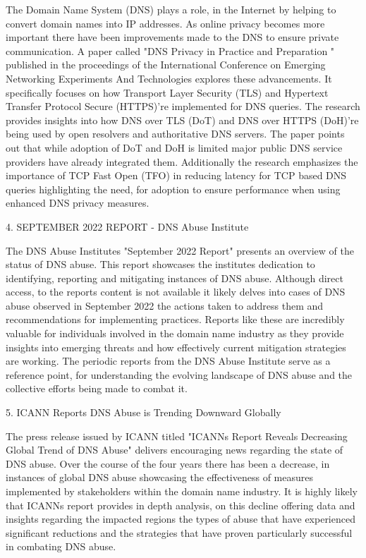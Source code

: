 The Domain Name System (DNS) plays a role, in the Internet by helping to convert domain names into IP addresses. As online privacy becomes more important there have been improvements made to the DNS to ensure private communication. A paper called "DNS Privacy in Practice and Preparation " published in the proceedings of the International Conference on Emerging Networking Experiments And Technologies explores these advancements. It specifically focuses on how Transport Layer Security (TLS) and Hypertext Transfer Protocol Secure (HTTPS)'re implemented for DNS queries. The research provides insights into how DNS over TLS (DoT) and DNS over HTTPS (DoH)'re being used by open resolvers and authoritative DNS servers. The paper points out that while adoption of DoT and DoH is limited major public DNS service providers have already integrated them. Additionally the research emphasizes the importance of TCP Fast Open (TFO) in reducing latency for TCP based DNS queries highlighting the need, for adoption to ensure performance when using enhanced DNS privacy measures.


4. SEPTEMBER 2022 REPORT - DNS Abuse Institute

The DNS Abuse Institutes "September 2022 Report" presents an overview of the status of DNS abuse. This report showcases the institutes dedication to identifying, reporting and mitigating instances of DNS abuse. Although direct access, to the reports content is not available it likely delves into cases of DNS abuse observed in September 2022 the actions taken to address them and recommendations for implementing practices. Reports like these are incredibly valuable for individuals involved in the domain name industry as they provide insights into emerging threats and how effectively current mitigation strategies are working. The periodic reports from the DNS Abuse Institute serve as a reference point, for understanding the evolving landscape of DNS abuse and the collective efforts being made to combat it.


5. ICANN Reports DNS Abuse is Trending Downward Globally

The press release issued by ICANN titled "ICANNs Report Reveals Decreasing Global Trend of DNS Abuse" delivers encouraging news regarding the state of DNS abuse. Over the course of the four years there has been a decrease, in instances of global DNS abuse showcasing the effectiveness of measures implemented by stakeholders within the domain name industry. It is highly likely that ICANNs report provides in depth analysis, on this decline offering data and insights regarding the impacted regions the types of abuse that have experienced significant reductions and the strategies that have proven particularly successful in combating DNS abuse.


